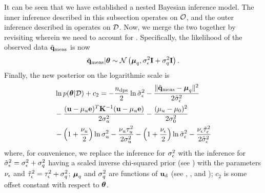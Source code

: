 It can be seen that we have established a nested Bayesian inference model. The inner inference described in this subsection operates on $\mathcal{O}$, and the outer inference described in  operates on $\mathcal{D}$. Now, we merge the two together by revisiting  wherein we need to account for . Specifically, the likelihood of the observed data $\tilde{\mathbf{q}}_{\text{meas}}$ is now
\begin{equation} \elabel{noise-approximation-model}
  \mvT_\meas | \vparam \sim \gaussian{\vmean_\T}{\sigma_\noise^2 \mI + \sigma_\T^2 \mI}.
\end{equation}
Finally, the new posterior on the logarithmic scale is
\begin{align}
  & \ln \f{\vparam | \Data} + c_2 = -\frac{\ndps}{2} \ln \tilde{\sigma}^2_\noise - \frac{\norm{\mvT_\meas - \vmean_\T}^2}{2 \tilde{\sigma}^2_\noise} \nonumber \\
  & {} - \frac{(\vu - \mu_\u \vI)^T\mCov^{-1}(\vu - \mu_\u \vI)}{2 \sigma_\u^2} - \frac{(\mu_\u - \mu_0)^2}{2 \sigma^2_0} \nonumber \\
  & {} - \left(1 + \frac{\nu_\u}{2}\right) \ln \sigma^2_\u - \frac{\nu_\u \tau_\u^2}{2 \sigma^2_\u} - \left(1 + \frac{\nu_\noise}{2}\right) \ln \tilde{\sigma}^2_\noise - \frac{\nu_\noise \tilde{\tau}_\noise^2}{2 \tilde{\sigma}^2_\noise} \elabel{log-posterior-surrogate}
\end{align}
where, for convenience, we replace the inference for $\sigma^2_\epsilon$ with the inference for $\tilde{\sigma}^2_\epsilon = \sigma^2_\epsilon + \sigma^2_q$ having a scaled inverse chi-squared prior (see ) with the parameters $\nu_\epsilon$ and $\tilde{\tau}^2_\epsilon = \tau^2_\epsilon + \sigma^2_q$; ${\boldsymbol\mu}_q$ and $\sigma^2_q$ are functions of $\mathbf{u}_{\text{d}}$ (see , , and ); $c_2$ is some offset constant with respect to ${\boldsymbol\theta}$.
